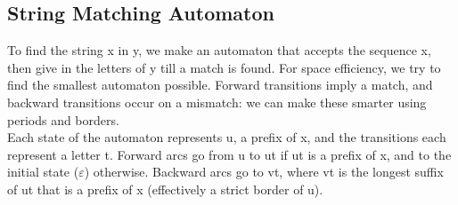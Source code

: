 \subsection{String Matching Automaton}
To find the string x in y, we make an automaton that accepts the sequence x, then give in the letters of y till a match is found. For space efficiency, we try to find the smallest automaton possible. Forward transitions imply a match, and backward transitions occur on a mismatch: we can make these smarter using periods and borders. \\

Each state of the automaton represents u, a prefix of x, and the transitions each represent a letter t. Forward arcs go from u to ut if ut is a prefix of x, and to the initial state ($\varepsilon$) otherwise. Backward arcs go to vt, where vt is the longest suffix of ut that is a prefix of x (effectively a strict border of u).